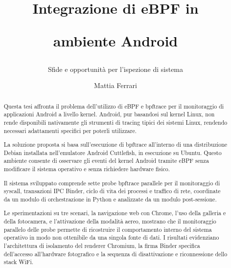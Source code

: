 \documentclass[italian,bachelor]{unibg}
\title{Integrazione di eBPF in   

 ambiente Android}
\subtitle{Sfide e opportunità per l'ispezione di sistema}
\author{Mattia Ferrari}
\begin{document}
\maketitle
\emptypage

\begin{abstract}
Questa tesi affronta il problema dell'utilizzo di eBPF e bpftrace per il monitoraggio di applicazioni Android a livello kernel. Android, pur basandosi sul kernel Linux, non rende disponibili nativamente gli strumenti di tracing tipici dei sistemi Linux, rendendo necessari adattamenti specifici per poterli utilizzare.

La soluzione proposta si basa sull'esecuzione di bpftrace all'interno di una distribuzione Debian installata nell'emulatore Android Cuttlefish, in esecuzione su Ubuntu. Questo ambiente consente di osservare gli eventi del kernel Android tramite eBPF senza modificare il sistema operativo e senza richiedere hardware fisico.

Il sistema sviluppato comprende sette probe bpftrace parallele per il monitoraggio di syscall, transazioni IPC Binder, ciclo di vita dei processi e traffico di rete, coordinate da un modulo di orchestrazione in Python e analizzate da un modulo post-sessione.

Le sperimentazioni su tre scenari, la navigazione web con Chrome, l'uso della galleria e della fotocamera, e l'attivazione della modalità aereo, mostrano che il monitoraggio parallelo delle probe permette di ricostruire il comportamento interno del sistema operativo in modo non ottenibile da una singola fonte di dati. I risultati evidenziano l'architettura di isolamento del renderer Chromium, la firma Binder specifica dell'accesso all'hardware fotografico e la sequenza di disattivazione e riconnessione dello stack WiFi.
\end{abstract}

\emptypage
\toc
\emptypage

\clearpage
{}









\nocite{*}
\printbibliography[heading=bibintoc]
\end{document}
